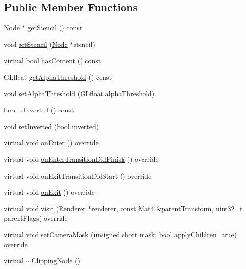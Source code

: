 \subsection*{Public Member Functions}
\begin{DoxyCompactItemize}
\item 
\hyperlink{classNode}{Node} $\ast$ \hyperlink{classClippingNode_a3163c62785c7d0af38ba70dd5188d20f}{get\+Stencil} () const
\item 
void \hyperlink{classClippingNode_ac8c8dfe6eb2eeb894546eef8b6404d71}{set\+Stencil} (\hyperlink{classNode}{Node} $\ast$stencil)
\item 
virtual bool \hyperlink{classClippingNode_a1592e959ae03a1ed1e5b91cd05b17465}{has\+Content} () const
\item 
G\+Lfloat \hyperlink{classClippingNode_a3b16e238ab1a53986857f9335a5a3147}{get\+Alpha\+Threshold} () const
\item 
void \hyperlink{classClippingNode_ae2c59683b09c8373c705839b06a64d48}{set\+Alpha\+Threshold} (G\+Lfloat alpha\+Threshold)
\item 
bool \hyperlink{classClippingNode_add176fbe7d1ef979d93ed5918159654f}{is\+Inverted} () const
\item 
void \hyperlink{classClippingNode_a0733496b02e0a3673ad3c8634ff757ed}{set\+Inverted} (bool inverted)
\item 
virtual void \hyperlink{classClippingNode_abf21272a53da13366c78ec704f0e0cd3}{on\+Enter} () override
\item 
virtual void \hyperlink{classClippingNode_a927d837090ada4bcdc8cedd40ef859f1}{on\+Enter\+Transition\+Did\+Finish} () override
\item 
virtual void \hyperlink{classClippingNode_ab45e60bbd0afe536e806f05a963dd512}{on\+Exit\+Transition\+Did\+Start} () override
\item 
virtual void \hyperlink{classClippingNode_abbe7e15178005613c97b8c88dea6ce6c}{on\+Exit} () override
\item 
virtual void \hyperlink{classClippingNode_abe6402dbaf99cbf1e4b16add726b2a56}{visit} (\hyperlink{classRenderer}{Renderer} $\ast$renderer, const \hyperlink{classMat4}{Mat4} \&parent\+Transform, uint32\+\_\+t parent\+Flags) override
\item 
virtual void \hyperlink{classClippingNode_afced4609ebbd5d239d1e3d07b6d4b217}{set\+Camera\+Mask} (unsigned short mask, bool apply\+Children=true) override
\item 
virtual \hyperlink{classClippingNode_a4e7dc5c29322dc19db638b2a9edd1109}{$\sim$\+Clipping\+Node} ()

\end{DoxyCompactItemize}
